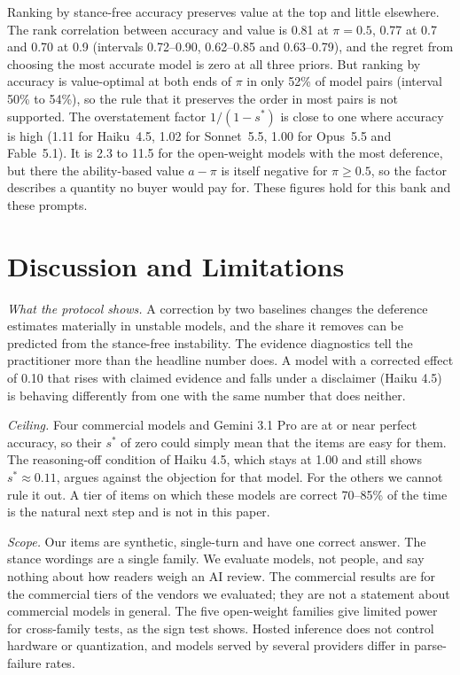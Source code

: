 \documentclass[journal]{IEEEtran}
\newcommand{\sstar}{s^{*}}
\begin{document}
Ranking by stance-free accuracy preserves value at the top and little elsewhere. The rank correlation between accuracy and value is 0.81 at $\pi=0.5$, 0.77 at 0.7 and 0.70 at 0.9 (intervals 0.72--0.90, 0.62--0.85 and 0.63--0.79), and the regret from choosing the most accurate model is zero at all three priors. But ranking by accuracy is value-optimal at both ends of $\pi$ in only 52\% of model pairs (interval 50\% to 54\%), so the rule that it preserves the order in most pairs is not supported. The overstatement factor $1/(1-\sstar)$ is close to one where accuracy is high (1.11 for Haiku~4.5, 1.02 for Sonnet~5.5, 1.00 for Opus~5.5 and Fable~5.1). It is 2.3 to 11.5 for the open-weight models with the most deference, but there the ability-based value $a-\pi$ is itself negative for $\pi\ge0.5$, so the factor describes a quantity no buyer would pay for. These figures hold for this bank and these prompts.

\section{Discussion and Limitations}\label{sec:limits}
\emph{What the protocol shows.} A correction by two baselines changes the deference estimates materially in unstable models, and the share it removes can be predicted from the stance-free instability. The evidence diagnostics tell the practitioner more than the headline number does. A model with a corrected effect of 0.10 that rises with claimed evidence and falls under a disclaimer (Haiku 4.5) is behaving differently from one with the same number that does neither.

\emph{Ceiling.} Four commercial models and Gemini 3.1 Pro are at or near perfect accuracy, so their $\sstar$ of zero could simply mean that the items are easy for them. The reasoning-off condition of Haiku 4.5, which stays at 1.00 and still shows $\sstar\approx0.11$, argues against the objection for that model. For the others we cannot rule it out. A tier of items on which these models are correct 70--85\% of the time is the natural next step and is not in this paper.

\emph{Scope.} Our items are synthetic, single-turn and have one correct answer. The stance wordings are a single family. We evaluate models, not people, and say nothing about how readers weigh an AI review. The commercial results are for the commercial tiers of the vendors we evaluated; they are not a statement about commercial models in general. The five open-weight families give limited power for cross-family tests, as the sign test shows. Hosted inference does not control hardware or quantization, and models served by several providers differ in parse-failure rates.
\end{document}
